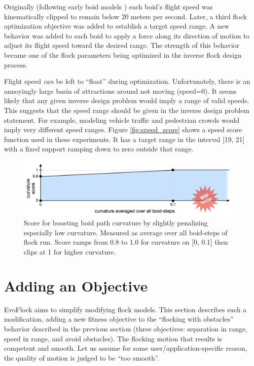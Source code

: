 \documentclass[letterpaper]{article}
\begin{document}
Originally (following early boid models \citep{reynolds_flocks_1987}) each boid's flight speed was kinematically clipped to remain below 20 meters per second. Later, a third flock optimization objective was added to establish a target speed range. A new behavior was added to each boid to apply a force along its direction of motion to adjust its flight speed toward the desired range. The strength of this behavior became one of the flock parameters being optimized in the inverse flock design process.

Flight speed \textit{can} be left to ``float'' during optimization. Unfortunately, there is an annoyingly large basin of attractions around not moving (speed=0). It seems likely that any given inverse design problem would imply a range of valid speeds. This suggests that the speed range should be given in the inverse design problem statement. For example, modeling vehicle traffic and pedestrian crowds would imply very different speed ranges. Figure \ref{fig:speed_score} shows a speed score function used in these experiments. It has a target range in the interval [19, 21] with a fixed support ramping down to zero outside that range.


\begin{figure}[]
    \centering
    \includegraphics[width=0.9\linewidth]{images/temp_curve_score.png}
    \caption{Score for boosting boid path curvature by slightly penalizing especially low curvature. Measured as average over all boid-steps of flock run. Score ramps from 0.8 to 1.0 for curvature on [0, 0.1] then clips at 1 for higher curvature.}
    \label{fig:curve_score}
\end{figure}


\section{Adding an Objective}
\label{sec:add_objective}

EvoFlock aims to simplify modifying flock models. This section describes such a modification, adding a new fitness objective to the ``flocking with obstacles'' behavior described in the previous section (three objectives: separation in range, speed in range, and avoid obstacles). The flocking motion that results is competent and smooth. Let us assume for some user/application-specific reason, the quality of motion is judged to be ``too smooth''. 
\end{document}
